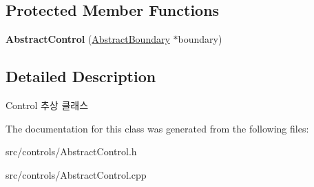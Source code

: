 \subsection*{Protected Member Functions}
\begin{DoxyCompactItemize}
\item 
\mbox{\label{class_abstract_control_aa762455bc70bbb9b065ef6c8715ec2e4}} 
{\bfseries Abstract\+Control} (\mbox{\hyperlink{class_abstract_boundary}{Abstract\+Boundary}} $\ast$boundary)
\end{DoxyCompactItemize}


\subsection{Detailed Description}
Control 추상 클래스 

The documentation for this class was generated from the following files\+:\begin{DoxyCompactItemize}
\item 
src/controls/Abstract\+Control.\+h\item 
src/controls/Abstract\+Control.\+cpp\end{DoxyCompactItemize}

